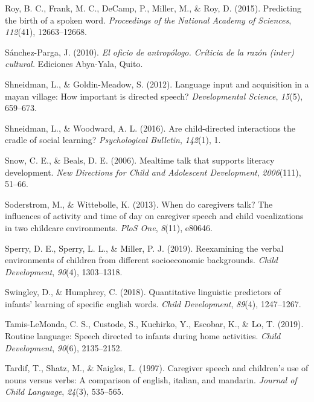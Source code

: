\documentclass[
  man,floatsintext]{apa6}
\newlength{\cslhangindent}
\newlength{\cslentryspacingunit} %
\newenvironment{CSLReferences}[2] %
 {%
  \setlength{\parindent}{0pt}
  \ifodd #1
  \let\oldpar\par
  \def\par{\hangindent=\cslhangindent\oldpar}
  \fi
  \setlength{\parskip}{#2\cslentryspacingunit}
 }%
 {}
\begin{document}
\begin{CSLReferences}{1}{0}
\leavevmode{}%
Roy, B. C., Frank, M. C., DeCamp, P., Miller, M., \& Roy, D. (2015). Predicting the birth of a spoken word. \emph{Proceedings of the National Academy of Sciences}, \emph{112}(41), 12663--12668.

\leavevmode{}%
Sánchez-Parga, J. (2010). \emph{El oficio de antrop{ó}logo. Cr{í}ticia de la raz{ó}n (inter) cultural.} Ediciones Abya-Yala, Quito.

\leavevmode{}%
Shneidman, L., \& Goldin-Meadow, S. (2012). Language input and acquisition in a mayan village: How important is directed speech? \emph{Developmental Science}, \emph{15}(5), 659--673.

\leavevmode{}%
Shneidman, L., \& Woodward, A. L. (2016). Are child-directed interactions the cradle of social learning? \emph{Psychological Bulletin}, \emph{142}(1), 1.

\leavevmode{}%
Snow, C. E., \& Beals, D. E. (2006). Mealtime talk that supports literacy development. \emph{New Directions for Child and Adolescent Development}, \emph{2006}(111), 51--66.

\leavevmode{}%
Soderstrom, M., \& Wittebolle, K. (2013). When do caregivers talk? The influences of activity and time of day on caregiver speech and child vocalizations in two childcare environments. \emph{PloS One}, \emph{8}(11), e80646.

\leavevmode{}%
Sperry, D. E., Sperry, L. L., \& Miller, P. J. (2019). Reexamining the verbal environments of children from different socioeconomic backgrounds. \emph{Child Development}, \emph{90}(4), 1303--1318.

\leavevmode{}%
Swingley, D., \& Humphrey, C. (2018). Quantitative linguistic predictors of infants' learning of specific english words. \emph{Child Development}, \emph{89}(4), 1247--1267.

\leavevmode{}%
Tamis-LeMonda, C. S., Custode, S., Kuchirko, Y., Escobar, K., \& Lo, T. (2019). Routine language: Speech directed to infants during home activities. \emph{Child Development}, \emph{90}(6), 2135--2152.

\leavevmode{}%
Tardif, T., Shatz, M., \& Naigles, L. (1997). Caregiver speech and children's use of nouns versus verbs: A comparison of english, italian, and mandarin. \emph{Journal of Child Language}, \emph{24}(3), 535--565.


\end{CSLReferences}
\end{document}
